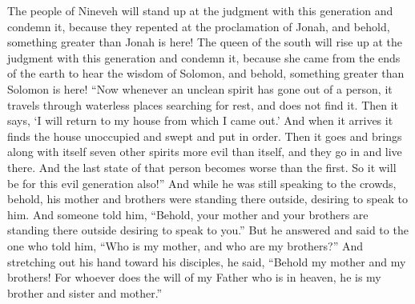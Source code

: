 \begin{biblechapter}
\verse The people of Nineveh will stand up at the judgment with this generation and condemn it, because they repented at the proclamation of Jonah, and behold, something greater than Jonah is here!
\verse The queen of the south will rise up at the judgment with this generation and condemn it, because she came from the ends of the earth to hear the wisdom of Solomon, and behold, something greater than Solomon is here!
 “Now whenever an unclean spirit has gone out of a person, it travels through waterless places searching for rest, and does not find it.
\verse Then it says, ‘I will return to my house from which I came out.’ And when it arrives it finds the house unoccupied and swept and put in order.
\verse Then it goes and brings along with itself seven other spirits more evil than itself, and they go in and live there. And the last state of that person becomes worse than the first. So it will be for this evil generation also!”
 And while he was still speaking to the crowds, behold, his mother and brothers were standing there outside, desiring to speak to him.
\verse And someone told him, “Behold, your mother and your brothers are standing there outside desiring to speak to you.”
\verse But he answered and said to the one who told him, “Who is my mother, and who are my brothers?”
\verse And stretching out his hand toward his disciples, he said, “Behold my mother and my brothers!
\verse For whoever does the will of my Father who is in heaven, he is my brother and sister and mother.”
\end{biblechapter}

